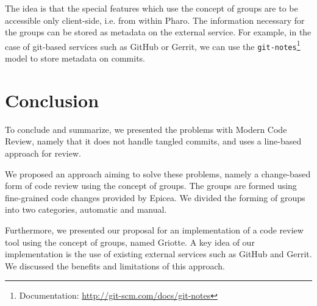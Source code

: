 \documentclass[conference,a4paper]{IEEEtran}
\newcommand{\Ep}{Epicea}
\newcommand{\Gr}{Griotte}
\newcommand{\code}[1]{\texttt{#1}}
\begin{document}
The idea is that the special features which use the concept of groups
are to be accessible only client-side, i.e. from within Pharo. The
information necessary for the groups can be stored as metadata on the
external service. For example, in the case of git-based services such
as GitHub or Gerrit, we can use the
\code{git-notes}\footnote{Documentation:
  \url{http://git-scm.com/docs/git-notes}} model to store metadata on
commits.

\section{Conclusion}
\label{sec:conclusion}
To conclude and summarize, we presented the problems with Modern Code
Review, namely that it does not handle tangled commits, and uses a
line-based approach for review.

We proposed an approach aiming to solve these problems, namely a
change-based form of code review using the concept of groups. The
groups are formed using fine-grained code changes provided by \Ep. We
divided the forming of groups into two categories, automatic and
manual.

Furthermore, we presented our proposal for an implementation of a code
review tool using the concept of groups, named \Gr. A key idea of our
implementation is the use of existing external services such as GitHub
and Gerrit. We discussed the benefits and limitations of this
approach.



\end{document}
